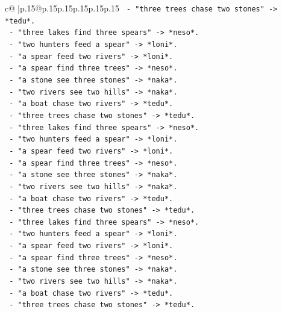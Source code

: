 \documentclass{article}
\begin{document}
{\begin{supertabular}{c@{$\;$}|p{.15\linewidth}@{}p{.15\linewidth}p{.15\linewidth}p{.15\linewidth}p{.15\linewidth}p{.15\linewidth}}
{{{\texttt{           {-} "three trees chase two stones" {-}> *tedu*.} \\
\texttt{           {-} "three lakes find three spears" {-}> *neso*.} \\
\texttt{           {-} "two hunters feed a spear" {-}> *loni*.} \\
\texttt{           {-} "a spear feed two rivers" {-}> *loni*.} \\
\texttt{           {-} "a spear find three trees" {-}> *neso*.} \\
\texttt{           {-} "a stone see three stones" {-}> *naka*.} \\
\texttt{           {-} "two rivers see two hills" {-}> *naka*.} \\
\texttt{           {-} "a boat chase two rivers" {-}> *tedu*.} \\
\texttt{           {-} "three trees chase two stones" {-}> *tedu*.} \\
\texttt{           {-} "three lakes find three spears" {-}> *neso*.} \\
\texttt{           {-} "two hunters feed a spear" {-}> *loni*.} \\
\texttt{           {-} "a spear feed two rivers" {-}> *loni*.} \\
\texttt{           {-} "a spear find three trees" {-}> *neso*.} \\
\texttt{           {-} "a stone see three stones" {-}> *naka*.} \\
\texttt{           {-} "two rivers see two hills" {-}> *naka*.} \\
\texttt{           {-} "a boat chase two rivers" {-}> *tedu*.} \\
\texttt{           {-} "three trees chase two stones" {-}> *tedu*.} \\
\texttt{           {-} "three lakes find three spears" {-}> *neso*.} \\
\texttt{           {-} "two hunters feed a spear" {-}> *loni*.} \\
\texttt{           {-} "a spear feed two rivers" {-}> *loni*.} \\
\texttt{           {-} "a spear find three trees" {-}> *neso*.} \\
\texttt{           {-} "a stone see three stones" {-}> *naka*.} \\
\texttt{           {-} "two rivers see two hills" {-}> *naka*.} \\
\texttt{           {-} "a boat chase two rivers" {-}> *tedu*.} \\
\texttt{           {-} "three trees chase two stones" {-}> *tedu*.} \\
}}}
\end{supertabular}}
\end{document}
